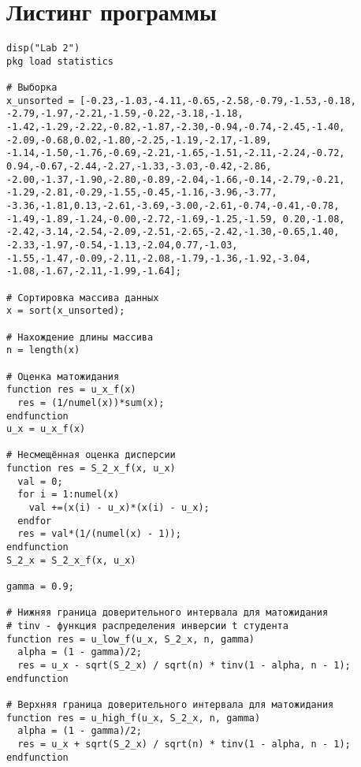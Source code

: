 \begin{figure}[H]
	\center{\texttt{[image: 1]}}
\end{figure}

\begin{figure}[H]
	\center{\texttt{[image: 2]}}
\end{figure}

\section{Листинг программы}
\begin{lstlisting}
disp("Lab 2")
pkg load statistics

# Выборка
x_unsorted = [-0.23,-1.03,-4.11,-0.65,-2.58,-0.79,-1.53,-0.18,
-2.79,-1.97,-2.21,-1.59,-0.22,-3.18,-1.18,
-1.42,-1.29,-2.22,-0.82,-1.87,-2.30,-0.94,-0.74,-2.45,-1.40,
-2.09,-0.68,0.02,-1.80,-2.25,-1.19,-2.17,-1.89,
-1.14,-1.50,-1.76,-0.69,-2.21,-1.65,-1.51,-2.11,-2.24,-0.72,
0.94,-0.67,-2.44,-2.27,-1.33,-3.03,-0.42,-2.86,
-2.00,-1.37,-1.90,-2.80,-0.89,-2.04,-1.66,-0.14,-2.79,-0.21,
-1.29,-2.81,-0.29,-1.55,-0.45,-1.16,-3.96,-3.77,
-3.36,-1.81,0.13,-2.61,-3.69,-3.00,-2.61,-0.74,-0.41,-0.78,
-1.49,-1.89,-1.24,-0.00,-2.72,-1.69,-1.25,-1.59, 0.20,-1.08,
-2.42,-3.14,-2.54,-2.09,-2.51,-2.65,-2.42,-1.30,-0.65,1.40,
-2.33,-1.97,-0.54,-1.13,-2.04,0.77,-1.03,
-1.55,-1.47,-0.09,-2.11,-2.08,-1.79,-1.36,-1.92,-3.04,
-1.08,-1.67,-2.11,-1.99,-1.64];

# Сортировка массива данных
x = sort(x_unsorted);

# Нахождение длины массива
n = length(x)

# Оценка матожидания
function res = u_x_f(x)
  res = (1/numel(x))*sum(x);
endfunction
u_x = u_x_f(x)

# Несмещённая оценка дисперсии
function res = S_2_x_f(x, u_x)
  val = 0;
  for i = 1:numel(x)
    val +=(x(i) - u_x)*(x(i) - u_x);
  endfor
  res = val*(1/(numel(x) - 1));
endfunction
S_2_x = S_2_x_f(x, u_x)

gamma = 0.9;

# Нижняя граница доверительного интервала для матожидания
# tinv - функция распределения инверсии t студента
function res = u_low_f(u_x, S_2_x, n, gamma)
  alpha = (1 - gamma)/2;
  res = u_x - sqrt(S_2_x) / sqrt(n) * tinv(1 - alpha, n - 1);
endfunction

# Верхняя граница доверительного интервала для матожидания
function res = u_high_f(u_x, S_2_x, n, gamma)
  alpha = (1 - gamma)/2;
  res = u_x + sqrt(S_2_x) / sqrt(n) * tinv(1 - alpha, n - 1);
endfunction


\end{lstlisting}
